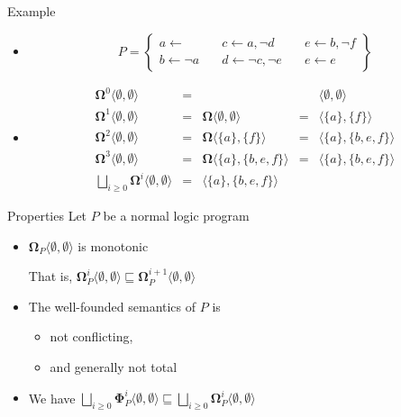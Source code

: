 \begin{frame}{Example}
  \begin{itemize}
  \item<1-> []
    \[
    P
    =
    \left\{
      \begin{array}{lll}
        a \leftarrow                  \quad &
        c \leftarrow a, \neg d       \quad &
        e \leftarrow b, \neg f
        \\
        b \leftarrow \neg a          \quad &
        d \leftarrow \neg c, \neg e \quad &
        e \leftarrow e
      \end{array}
    \right\}
    \]

  \item<2-> []
    \[
    \begin{array}{rclcl}
      \mathbf{\Omega}^0\langle\emptyset,\emptyset\rangle&=&                                                & &\langle\emptyset,\emptyset\rangle
      \\
      \mathbf{\Omega}^1\langle\emptyset,\emptyset\rangle&=&\mathbf{\Omega}\langle\emptyset,\emptyset\rangle&=&\langle\{a\}    ,\{f\}    \rangle
      \\
      \mathbf{\Omega}^2\langle\emptyset,\emptyset\rangle&=&\mathbf{\Omega}\langle\{a\}    ,\{f\}    \rangle&=&\langle\{a\}    ,\{b,e,f\}\rangle
      \\
      \mathbf{\Omega}^3\langle\emptyset,\emptyset\rangle&=&\mathbf{\Omega}\langle\{a\}    ,\{b,e,f\}\rangle&=&\langle\{a\}    ,\{b,e,f\}\rangle
      \\[10pt]
      \bigsqcup_{i \geq 0}\mathbf{\Omega}^i\langle\emptyset,\emptyset\rangle&=&\langle\{a\},\{b,e,f\}\rangle
    \end{array}
    \]
  \end{itemize}
\end{frame}
\begin{frame}{Properties}
  \bigskip
  Let $P$ be a normal logic program
  \medskip
  \begin{itemize}
  \item ${\mathbf{\Omega}}_P\langle \emptyset, \emptyset \rangle$ is monotonic

    That is,
    \(
    {\mathbf{\Omega}}_P^i\langle \emptyset, \emptyset \rangle
    \sqsubseteq
    {\mathbf{\Omega}}_P^{i+1}\langle \emptyset, \emptyset \rangle
    \)
    \smallskip
  \item The well-founded semantics of $P$ is
    \begin{itemize}
    \item not conflicting,
    \item and generally not total
    \end{itemize}
  \item We have
    \(
    \bigsqcup_{i \geq 0}
    {\mathbf{\Phi}}_P^i \langle \emptyset, \emptyset \rangle
    \sqsubseteq
    \bigsqcup_{i \geq 0} {\mathbf{\Omega}}_P^i \langle
    \emptyset, \emptyset \rangle
    \)
  \end{itemize}
\end{frame}
